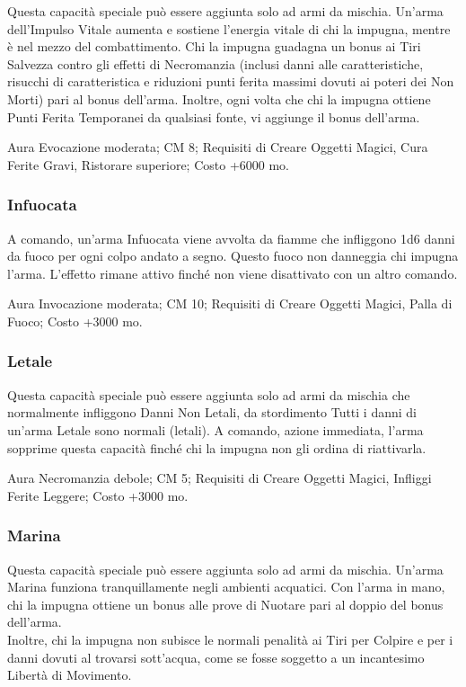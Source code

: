\begin{multicols}{2}
Questa capacità speciale può essere aggiunta solo ad armi da mischia. Un'arma dell'Impulso Vitale aumenta e sostiene l'energia vitale di chi la impugna, mentre è nel mezzo del combattimento. Chi la impugna guadagna un bonus ai Tiri Salvezza contro gli effetti di Necromanzia (inclusi danni alle caratteristiche, risucchi di caratteristica e riduzioni punti ferita massimi dovuti ai poteri dei Non Morti) pari al bonus dell'arma. Inoltre, ogni volta che chi la impugna ottiene Punti Ferita Temporanei da qualsiasi fonte, vi aggiunge il bonus dell'arma.

Aura Evocazione moderata; CM 8; Requisiti di Creare Oggetti Magici, Cura Ferite Gravi, Ristorare superiore; Costo +6000 mo.

\subsubsection{Infuocata}

A comando, un'arma Infuocata viene avvolta da fiamme che infliggono 1d6 danni da fuoco per ogni colpo andato a segno. Questo fuoco non danneggia chi impugna l'arma. L'effetto rimane attivo finché non viene disattivato con un altro comando.

Aura Invocazione moderata; CM 10; Requisiti di Creare Oggetti Magici, Palla di Fuoco; Costo +3000 mo.

\subsubsection{Letale}

Questa capacità speciale può essere aggiunta solo ad armi da mischia che normalmente infliggono Danni Non Letali, da stordimento Tutti i danni di un'arma Letale sono normali (letali). A comando, azione immediata, l'arma sopprime questa capacità finché chi la impugna non gli ordina di riattivarla.

Aura Necromanzia debole; CM 5; Requisiti di Creare Oggetti Magici, Infliggi Ferite Leggere; Costo +3000 mo.

\subsubsection{Marina}

Questa capacità speciale può essere aggiunta solo ad armi da mischia. Un'arma Marina funziona tranquillamente negli ambienti acquatici. Con l'arma in mano, chi la impugna ottiene un bonus alle prove di Nuotare pari al doppio del bonus dell'arma. \\
Inoltre, chi la impugna non subisce le normali penalità ai Tiri per Colpire e per i danni dovuti al trovarsi sott'acqua, come se fosse soggetto a un incantesimo Libertà di Movimento.


\end{multicols}
